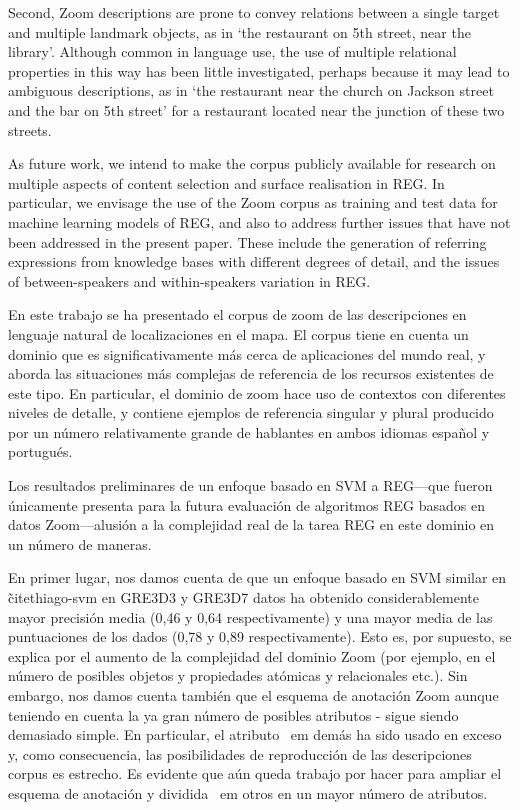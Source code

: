Second, Zoom descriptions are prone to convey relations between a single target and multiple landmark objects, as in `the restaurant on 5th street, near the library'. Although common in language use, the use of multiple relational properties in this way has been little investigated, perhaps because it may lead to ambiguous descriptions, as in `the restaurant near the church on Jackson street and the bar on 5th street' for a restaurant located near the junction of these two streets.

As future work, we intend to make the corpus publicly available for research on multiple aspects of content selection and surface realisation in REG. In particular, we envisage the use of the Zoom corpus as training and test data for machine learning models of REG, and also to address further issues that have not been addressed in the present paper. These include  the generation of referring expressions from knowledge bases with different degrees of detail, and the issues of between-speakers and within-speakers variation in REG.

En este trabajo se ha presentado el corpus de zoom de las descripciones en lenguaje natural de localizaciones en el mapa. El corpus tiene en cuenta un dominio que es significativamente m\'as cerca de aplicaciones del mundo real, y aborda las situaciones m\'as complejas de referencia de los recursos existentes de este tipo. En particular, el dominio de zoom hace uso de contextos con diferentes niveles de detalle, y contiene ejemplos de referencia singular y plural producido por un n\'umero relativamente grande de hablantes en ambos idiomas espa\~nol y portugu\'es.

Los resultados preliminares de un enfoque basado en SVM a REG---que fueron \'unicamente presenta para la futura evaluaci\'on de algoritmos REG basados en datos Zoom---alusi\'on a la complejidad real de la tarea REG en este dominio en un n\'umero de maneras.

En primer lugar, nos damos cuenta de que un enfoque basado en SVM similar en \~cite{thiago-svm} en GRE3D3 y GRE3D7 datos ha obtenido considerablemente mayor precisi\'on media (0,46 y 0,64 respectivamente) y una mayor media de las puntuaciones de los dados (0,78 y 0,89 respectivamente). Esto es, por supuesto, se explica por el aumento de la complejidad del dominio Zoom (por ejemplo, en el n\'umero de posibles objetos y propiedades at\'omicas y relacionales etc.). Sin embargo, nos damos cuenta tambi\'en que el esquema de anotaci\'on Zoom \- aunque teniendo en cuenta la ya gran n\'umero de posibles atributos - sigue siendo demasiado simple. En particular, el atributo {\ em dem\'as} ha sido usado en exceso y, como consecuencia, las posibilidades de reproducci\'on de las descripciones corpus es estrecho. Es evidente que a\'un queda trabajo por hacer para ampliar el esquema de anotaci\'on y dividida {\ em otros} en un mayor n\'umero de atributos.


